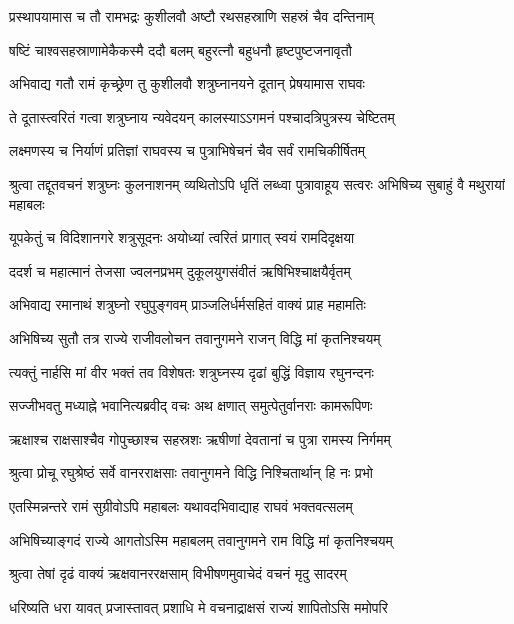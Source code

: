 \twolineshloka
{प्रस्थापयामास च तौ रामभद्रः कुशीलवौ}
{अष्टौ रथसहस्राणि सहस्रं चैव दन्तिनाम्} %

\twolineshloka
{षष्टिं चाश्वसहस्राणामेकैकस्मै ददौ बलम्}
{बहुरत्नौ बहुधनौ हृष्टपुष्टजनावृतौ} %

\twolineshloka
{अभिवाद्य गतौ रामं कृच्छ्रेण तु कुशीलवौ}
{शत्रुघ्नानयने दूतान् प्रेषयामास राघवः} %

\twolineshloka
{ते दूतास्त्वरितं गत्वा शत्रुघ्नाय न्यवेदयन्}
{कालस्याऽऽगमनं पश्चादत्रिपुत्रस्य चेष्टितम्} %

\twolineshloka
{लक्ष्मणस्य च निर्याणं प्रतिज्ञां राघवस्य च}
{पुत्राभिषेचनं चैव सर्वं रामचिकीर्षितम्} %

\threelineshloka
{श्रुत्वा तद्दूतवचनं शत्रुघ्नः कुलनाशनम्}
{व्यथितोऽपि धृतिं लब्ध्वा पुत्रावाहूय सत्वरः}
{अभिषिच्य सुबाहुं वै मथुरायां महाबलः} %

\twolineshloka
{यूपकेतुं च विदिशानगरे शत्रुसूदनः}
{अयोध्यां त्वरितं प्रागात् स्वयं रामदिदृक्षया} %

\twolineshloka
{ददर्श च महात्मानं तेजसा ज्वलनप्रभम्}
{दुकूलयुगसंवीतं ऋषिभिश्चाक्षयैर्वृतम्} %

\twolineshloka
{अभिवाद्य रमानाथं शत्रुघ्नो रघुपुङ्गवम्}
{प्राञ्जलिर्धर्मसहितं वाक्यं प्राह महामतिः} %

\twolineshloka
{अभिषिच्य सुतौ तत्र राज्ये राजीवलोचन}
{तवानुगमने राजन् विद्धि मां कृतनिश्चयम्} %

\twolineshloka
{त्यक्तुं नार्हसि मां वीर भक्तं तव विशेषतः}
{शत्रुघ्नस्य दृढां बुद्धिं विज्ञाय रघुनन्दनः} %

\twolineshloka
{सज्जीभवतु मध्याह्ने भवानित्यब्रवीद् वचः}
{अथ क्षणात् समुत्पेतुर्वानराः कामरूपिणः} %

\twolineshloka
{ऋक्षाश्च राक्षसाश्चैव गोपुच्छाश्च सहस्रशः}
{ऋषीणां देवतानां च पुत्रा रामस्य निर्गमम्} %

\twolineshloka
{श्रुत्वा प्रोचू रघुश्रेष्ठं सर्वे वानरराक्षसाः}
{तवानुगमने विद्धि निश्चितार्थान् हि नः प्रभो} %

\twolineshloka
{एतस्मिन्नन्तरे रामं सुग्रीवोऽपि महाबलः}
{यथावदभिवाद्याह राघवं भक्तवत्सलम्} %

\twolineshloka
{अभिषिच्याङ्गदं राज्ये आगतोऽस्मि महाबलम्}
{तवानुगमने राम विद्धि मां कृतनिश्चयम्} %

\twolineshloka
{श्रुत्वा तेषां दृढं वाक्यं ऋक्षवानररक्षसाम्}
{विभीषणमुवाचेदं वचनं मृदु सादरम्} %

\twolineshloka
{धरिष्यति धरा यावत् प्रजास्तावत् प्रशाधि मे}
{वचनाद्राक्षसं राज्यं शापितोऽसि ममोपरि} %

